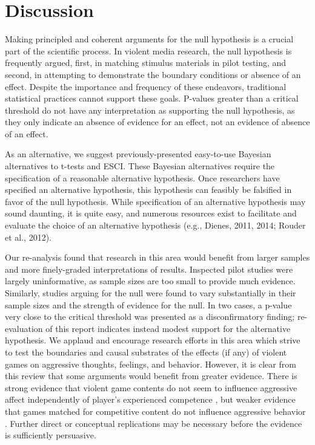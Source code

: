 \documentclass[fignum,nobf,man]{apa}
\begin{document}
\section{Discussion} %
Making principled and coherent arguments for the null hypothesis is a crucial part of the scientific process. In violent media research, the null hypothesis is frequently argued, first, in matching stimulus materials in pilot testing, and second, in attempting to demonstrate the boundary conditions or absence of an effect. Despite the importance and frequency of these endeavors, traditional statistical practices cannot support these goals. P-values greater than a critical threshold do not have any interpretation as supporting the null hypothesis, as they only indicate an absence of evidence for an effect, not an evidence of absence of an effect.

As an alternative, we suggest previously-presented easy-to-use Bayesian alternatives to t-tests and ESCI. These Bayesian alternatives require the specification of a reasonable alternative hypothesis. Once researchers have specified an alternative hypothesis, this hypothesis can feasibly be falsified in favor of the null hypothesis. While specification of an alternative hypothesis may sound daunting, it is quite easy, and numerous resources exist to facilitate and evaluate the choice of an alternative hypothesis (e.g., Dienes, 2011, 2014; Rouder et al., 2012). %

Our re-analysis found that research in this area would benefit from larger samples and more finely-graded interpretations of results. Inspected pilot studies were largely uninformative, as sample sizes are too small to provide much evidence. Similarly, studies arguing for the null were found to vary substantially in their sample sizes and the strength of evidence for the null. In two cases, a p-value very close to the critical threshold was presented as a disconfirmatory finding; re-evaluation of this report indicates instead modest support for the alternative hypothesis. We applaud and encourage research efforts in this area which strive to test the boundaries and causal substrates of the effects (if any) of violent games on aggressive thoughts, feelings, and behavior. However, it is clear from this review that some arguments would benefit from greater evidence. There is strong evidence that violent game contents do not seem to influence aggressive affect independently of player's experienced competence \citep{Przybylski:etal:2014}, but weaker evidence that games matched for competitive content do not influence aggressive behavior \citep{Adachi:Willoughby:2011}. Further direct or conceptual replications may be necessary before the evidence is sufficiently persuasive. 
\end{document}
